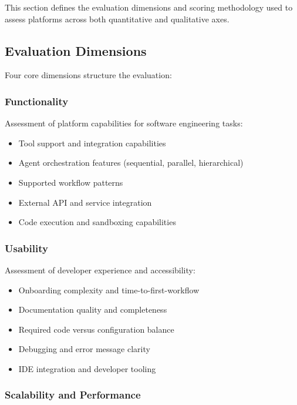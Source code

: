\documentclass[]
{UCD_CS_FYP_Report}
\begin{document}
This section defines the evaluation dimensions and scoring methodology used to assess platforms across both quantitative and qualitative axes.

\subsection{Evaluation Dimensions}

Four core dimensions structure the evaluation:

\subsubsection{Functionality}

Assessment of platform capabilities for software engineering tasks:

\begin{itemize}
  \item Tool support and integration capabilities
  \item Agent orchestration features (sequential, parallel, hierarchical)
  \item Supported workflow patterns
  \item External API and service integration
  \item Code execution and sandboxing capabilities
\end{itemize}

\subsubsection{Usability}

Assessment of developer experience and accessibility:

\begin{itemize}
  \item Onboarding complexity and time-to-first-workflow
  \item Documentation quality and completeness
  \item Required code versus configuration balance
  \item Debugging and error message clarity
  \item IDE integration and developer tooling
\end{itemize}

\subsubsection{Scalability and Performance}
\end{document}
